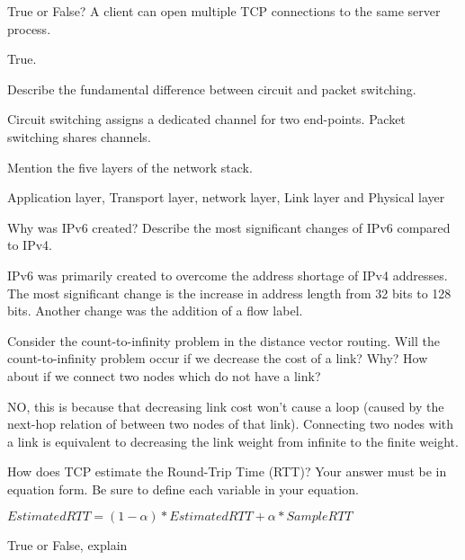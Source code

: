 \documentclass[answers,addpoints]{exam}
\begin{document}
\begin{questions}
\question 
True or False? A client can open multiple TCP connections to the same server process. 
\fillwithdottedlines{0.5in}
\begin{solution} 
True.
\end{solution} 

\question 
Describe the fundamental difference between circuit and packet switching.
\fillwithdottedlines{1in}
\begin{solution} 
Circuit switching assigns a dedicated channel for two end-points.   Packet switching shares channels.
\end{solution} 

\question 
Mention the five layers of the network stack. 
\fillwithdottedlines{1in}
\begin{solution} 
Application layer, Transport layer, network layer, Link layer and Physical layer
\end{solution} 

\question 
Why was IPv6 created? Describe the most significant changes of IPv6 compared to IPv4.
\fillwithdottedlines{1in}
\begin{solution} 
IPv6 was primarily created to overcome the address shortage of IPv4 addresses. The most significant change is the increase in address length from 32 bits to 128 bits. Another change was the addition of a flow label.
\end{solution}

\question 
Consider the count-to-infinity problem in the distance vector routing. Will the count-to-infinity problem occur if we decrease the cost of a link? Why? How about if we connect two nodes which do not have a link?
\fillwithdottedlines{1in}
\begin{solution} 
NO, this is because that decreasing link cost won’t cause a loop (caused by the next-hop relation of between two nodes of that link). Connecting two nodes with a link is equivalent to decreasing the link weight from infinite to the finite weight.
\end{solution}

\question 
How does TCP estimate the Round-Trip Time (RTT)? Your answer must be in equation form. Be sure to define each variable in your equation. 
\fillwithdottedlines{0.5in}
\begin{solution} 
$EstimatedRTT=(1-\alpha)*EstimatedRTT+ \alpha*SampleRTT$
\end{solution}


\question 
True or False, explain
\end{questions}
\end{document}
